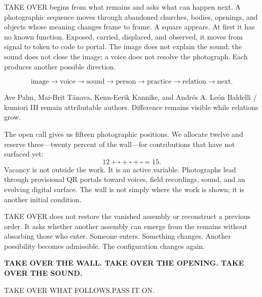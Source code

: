 \documentclass[10pt]{article}
\newcommand{\displayfont}{\rmfamily\bfseries}
\newlength{\mainmeasure}
\begin{document}
\begin{minipage}{\mainmeasure}
{    

    TAKE OVER begins from what remains and asks what can happen next. A
    photographic sequence moves through abandoned churches, bodies, openings,
    and objects whose meaning changes frame to frame. A square appears. At first
    it has no known function. Exposed, carried, displaced, and observed, it moves
    from signal to token to code to portal. The image does not explain the sound;
    the sound does not close the image; a voice does not resolve the photograph.
    Each produces another possible direction.\par\vspace{2mm}

    \[
      \mathrm{image}\rightarrow\mathrm{voice}\rightarrow\mathrm{sound}
      \rightarrow\mathrm{person}\rightarrow\mathrm{practice}
      \rightarrow\mathrm{relation}\rightarrow\mathrm{next}.
    \]

    Ave Palm, Mai-Brit T\"anava, Kenn-Eerik Kannike, and Andrés A.
    Le\'on Baldelli / kumiori III remain attributable authors. Difference remains
    visible while relations grow.\par\vspace{3mm}

    The open call gives us fifteen photographic positions. We allocate twelve
    and reserve three---twenty percent of the wall---for contributions that have
    not surfaced yet:
    \[
      12+\square+\square+\square=15.
    \]
    Vacancy is not outside the work. It is an active variable. Photographs lead
    through provisional QR portals toward voices, field recordings, sound, and
    an evolving digital surface. The wall is not simply where the work is shown;
    it is another initial condition.\par\vspace{3mm}

    TAKE OVER does not restore the vanished assembly or reconstruct a previous
    order. It asks whether another assembly can emerge from the remains without
    absorbing those who enter. Someone enters. Something changes. Another
    possibility becomes admissible. The configuration changes again.}
  \vspace{5mm}
  {\displayfont\fontsize{14}{16}\selectfont
    TAKE OVER THE WALL. TAKE OVER THE OPENING. TAKE OVER THE SOUND.\par
    TAKE OVER WHAT FOLLOWS.\quad PASS IT ON.}
\end{minipage}
\newpage
\end{document}
